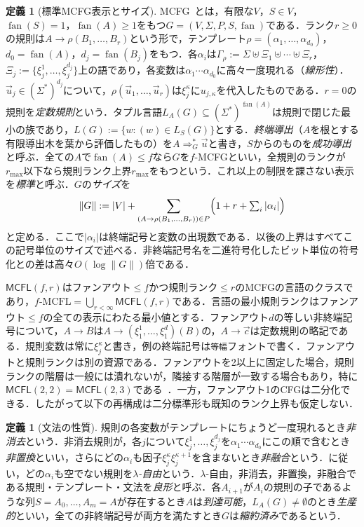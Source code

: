 \documentclass[11pt,a4paper]{ltjsarticle}
\numberwithin{equation}{section}
\theoremstyle{plain}
\theoremstyle{definition}
\newtheorem{definition}[theorem]{定義}
\theoremstyle{remark}
\newcommand{\tuple}[1]{\vec{#1}}
\newcommand{\fan}{\operatorname{fan}}
\begin{document}
\begin{definition}[標準MCFG表示とサイズ]
\label{def:standard-mcfg}
MCFG~\cite{SekiEtAl1991,Kallmeyer2010}とは，有限な$V$，$S\in V$，$\fan(S)=1$，$\fan(A)\ge1$をもつ$G=(V,\Sigma,P,S,\fan)$である．ランク$r\ge0$の規則は$A\to\rho(B_1,\ldots,B_r)$という形で，テンプレート$\rho=(\alpha_1,\ldots,\alpha_{d_0})$，$d_0=\fan(A)$，$d_j=\fan(B_j)$をもつ．各$\alpha_i$は$\Gamma_\rho:=\Sigma\uplus\Xi_1\uplus\cdots\uplus\Xi_r$，$\Xi_j:=\{\xi_j^1,\ldots,\xi_j^{d_j}\}$上の語であり，各変数は$\alpha_1\cdots\alpha_{d_0}$に高々一度現れる（\emph{線形性}）．$\tuple u_j\in(\Sigma^*)^{d_j}$について，$\rho(\tuple u_1,\ldots,\tuple u_r)$は$\xi_j^\kappa$に$u_{j,\kappa}$を代入したものである．$r=0$の規則を\emph{定数規則}という．タプル言語$L_A(G)\subseteq(\Sigma^*)^{\fan(A)}$は規則で閉じた最小の族であり，$L(G):=\{w:(w)\in L_S(G)\}$とする．\emph{終端導出}（$A$を根とする有限導出木を葉から評価したもの）を$A\Rightarrow_G^*\tuple u$と書き，$S$からのものを\emph{成功導出}と呼ぶ．全ての$A$で$\fan(A)\le f$なら$G$を$f$-MCFGといい，全規則のランクが$r_{\max}$以下なら規則ランク上界$r_{\max}$をもつという．これ以上の制限を課さない表示を\emph{標準}と呼ぶ．$G$の\emph{サイズ}を
\[
 \|G\|:=|V|+\sum_{(A\to\rho(B_1,\ldots,B_r))\in P}
 \Bigl(1+r+\textstyle\sum_{i}|\alpha_i|\Bigr)
\]
と定める．ここで$|\alpha_i|$は終端記号と変数の出現数である．以後の上界はすべてこの記号単位のサイズで述べる．非終端記号名を二進符号化したビット単位の符号化との差は高々$O(\log\|G\|)$倍である．
\end{definition}

$\mathsf{MCFL}(f,r)$はファンアウト$\le f$かつ規則ランク$\le r$のMCFGの言語のクラスであり，$f\text{-}\mathrm{MCFL}=\bigcup_{r<\infty}\mathsf{MCFL}(f,r)$である．言語の最小規則ランクはファンアウト$\le f$の全ての表示にわたる最小値とする．ファンアウト$d$の等しい非終端記号について，$A\to B$は$A\to(\xi_1^1,\ldots,\xi_1^d)(B)$の，$A\to\tuple c$は定数規則の略記である．規則変数は常に$\xi_j^\kappa$と書き，例の終端記号は\texttt{等幅}フォントで書く．ファンアウトと規則ランクは別の資源である．ファンアウトを2以上に固定した場合，規則ランクの階層は一般には潰れないが，隣接する階層が一致する場合もあり，特に$\mathsf{MCFL}(2,2)=\mathsf{MCFL}(2,3)$である~\cite{RambowSatta1999,GomezRodriguezEtAl2009}．一方，ファンアウト1のCFGは二分化できる．したがって以下の再構成は二分標準形も既知のランク上界も仮定しない．

\begin{definition}[文法の性質]
\label{def:grammar-properties}
規則の各変数がテンプレートにちょうど一度現れるとき\emph{非消去}という．非消去規則が，各$j$について$\xi_j^1,\ldots,\xi_j^{d_j}$を$\alpha_1\cdots\alpha_{d_0}$にこの順で含むとき\emph{非置換}といい，さらにどの$\alpha_i$も因子$\xi_j^\kappa\xi_j^{\kappa+1}$を含まないとき\emph{非融合}という．\cite[Section~2.3]{Yoshinaka2011}に従い，どの$\alpha_i$も空でない規則を\emph{$\lambda$-自由}という．$\lambda$-自由，非消去，非置換，非融合である規則・テンプレート・文法を\emph{良形}と呼ぶ．各$A_{i+1}$が$A_i$の規則の子であるような列$S=A_0,\ldots,A_m=A$が存在するとき$A$は\emph{到達可能}，$L_A(G)\ne\emptyset$のとき\emph{生産的}といい，全ての非終端記号が両方を満たすとき$G$は\emph{縮約済み}であるという．
\end{definition}
\end{document}
